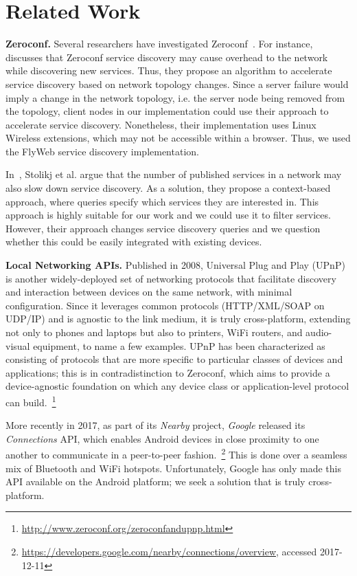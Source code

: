 \section{Related Work}
\label{sec:related_work}

\textbf{Zeroconf.}
Several researchers have investigated Zeroconf~\cite{Gunes2002, Bohnenkamp2003, Jara:2012:IPv6DNS-SD}.
For instance, \cite{hong2007accelerating} discusses that Zeroconf service discovery may cause overhead to the network while discovering new services.
Thus, they propose an algorithm to accelerate service discovery based on network topology changes.
Since a server failure would imply a change in the network topology, i.e. the server node being removed from the topology, 
client nodes in our implementation could use their approach to accelerate service discovery. 
Nonetheless, their implementation uses Linux Wireless extensions, which may not be accessible within a browser.
Thus, we used the FlyWeb service discovery implementation.

In~\cite{stolikj2016context}, Stolikj et al. argue that the number of published services in a network may also slow down service discovery.
As a solution, they propose a context-based approach, where queries specify which services they are interested in.
This approach is highly suitable for our work and we could use it to filter \APIshort services.
However, their approach changes service discovery queries and we question whether this could be easily integrated with existing devices.


\textbf{Local Networking APIs.}
Published in 2008, Universal Plug and Play (UPnP) is another widely-deployed set of networking protocols that facilitate discovery and interaction between devices on the same network, with minimal configuration.
Since it leverages common protocols (HTTP/XML/SOAP on UDP/IP) and is agnostic to the link medium, it is truly cross-platform, extending not only to phones and laptops but also to printers, WiFi routers, and audio-visual equipment, to name a few examples.
UPnP has been characterized as consisting of protocols that are more specific to particular classes of devices and applications; this is in contradistinction to Zeroconf, which aims to provide a device-agnostic foundation on which any device class or application-level protocol can build.~\footnote{\url{http://www.zeroconf.org/zeroconfandupnp.html}}

More recently in 2017, as part of its \textit{Nearby} project, \textit{Google} released its \textit{Connections} API, which enables Android devices in close proximity to one another to communicate in a peer-to-peer fashion.~\footnote{\url{https://developers.google.com/nearby/connections/overview}, accessed 2017-12-11}
This is done over a seamless mix of Bluetooth and WiFi hotspots.
Unfortunately, Google has only made this API available on the Android platform; we seek a solution that is truly cross-platform.

